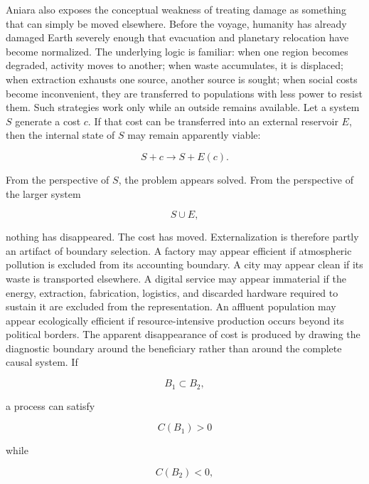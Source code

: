 \documentclass[11pt,oneside]{book}
\theoremstyle{definition}
\theoremstyle{remark}
\begin{document}
Aniara also exposes the conceptual weakness of treating damage as something that can simply be moved
elsewhere. Before the voyage, humanity has already damaged Earth severely enough that evacuation and
planetary relocation have become normalized. The underlying logic is familiar: when one region
becomes degraded, activity moves to another; when waste accumulates, it is displaced; when
extraction exhausts one source, another source is sought; when social costs become inconvenient,
they are transferred to populations with less power to resist them. Such strategies work only while
an outside remains available. Let a system \(S\) generate a cost \(c\). If that cost can be
transferred into an external reservoir \(E\), then the internal state of \(S\) may remain apparently
viable:

\[
S+c \rightarrow S+E(c).
\]

From the perspective of \(S\), the problem appears solved. From the perspective of the larger system

\[
S\cup E,
\]

nothing has disappeared. The cost has moved. Externalization is therefore partly an artifact of
boundary selection. A factory may appear efficient if atmospheric pollution is excluded from its
accounting boundary. A city may appear clean if its waste is transported elsewhere. A digital
service may appear immaterial if the energy, extraction, fabrication, logistics, and discarded
hardware required to sustain it are excluded from the representation. An affluent population may
appear ecologically efficient if resource-intensive production occurs beyond its political borders.
The apparent disappearance of cost is produced by drawing the diagnostic boundary around the
beneficiary rather than around the complete causal system. If

\[
B_1\subset B_2,
\]

a process can satisfy

\[
C(B_1)>0
\]

while

\[
C(B_2)<0,
\]
\end{document}

